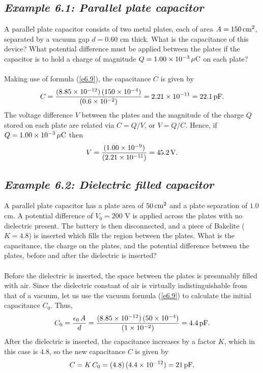 \subsection*{\em Example 6.1: Parallel plate capacitor}
 A parallel plate capacitor consists of two metal
plates, each of area $A=150\,{\rm cm}^2$, separated by a vacuum gap
$d=0.60$ cm thick. What is the capacitance of this device? What potential
difference must be applied between the plates if the capacitor
is to hold a charge of magnitude $Q=1.00\times 10^{-3}\,\mu{\rm C}$ on each
plate?\\
~\\
 Making use of formula (\ref{e6.9}), the capacitance
$C$ is given by
$$
C= \frac{(8.85\times 10^{-12})\,(150\times 10^{-4})}{(0.6\times 10^{-2})}
=2.21\times 10^{-11} = 22.1\,{\rm pF}.
$$
The voltage difference $V$ between the plates and
the magnitude of the charge $Q$ stored on each plate are related via
$C = Q/V$, or $V = Q/C$. Hence, if $Q=1.00\times 10^{-3}\,\mu{\rm C}$ then
$$
V = \frac{ (1.00\times 10^{-9})}{(2.21\times 10^{-11})} = 45.2\, {\rm V}.
$$


\subsection*{\em Example 6.2: Dielectric filled capacitor}
A parallel plate capacitor has a plate area of $50\,{\rm cm}^2$ and a plate
separation of $1.0$ cm. A potential difference of $V_0= 200$ V is applied
across the plates with no dielectric present. The battery is then disconnected,
and a piece of Bakelite ($K=4.8$) is inserted which fills the region between
the plates. What is the capacitance, the charge on the plates, and the
potential difference between the plates, before and after the dielectric
is inserted?\\
~\\
 Before the dielectric is inserted, 
the space between the plates is presumably filled
with air. Since the dielectric constant of air is virtually
indistinguishable from that of a vacuum, let us use the vacuum formula (\ref{e6.9}) to
calculate the initial capacitance $C_0$. Thus,
$$
C_0=\frac{\epsilon_0\,A}{d} = \frac{(8.85\times 10^{-12})\,(50\times 10^{-4})}
{(1\times 10^{-2})} = 4.4\,{\rm pF}.
$$
After the dielectric is inserted, the capacitance increases by a factor $K$,
which in this case is $4.8$, so the new capacitance $C$ is given by
$$
C= K\,C_0 = (4.8)\, (4.4 \times 10^{-12}) = 21\,{\rm pF}.
$$


